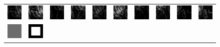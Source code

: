 \documentclass[al, 27pt, plainboxedsections, landscape]{sciposter}
\begin{document}
\begin{multicols}{3}
\begin{figure}[!t]
{\begin{tabular}{cccccccccc}
  \includegraphics[width=0.095\linewidth]{images/micro512_1001}  & \includegraphics[width=0.095\linewidth]{images/micro512_1002} &
  \includegraphics[width=0.095\linewidth]{images/micro512_1003} & \includegraphics[width=0.095\linewidth]{images/micro512_1004} &
  \includegraphics[width=0.095\linewidth]{images/micro512_1005} &
  \includegraphics[width=0.095\linewidth]{images/micro512_1006}  & \includegraphics[width=0.095\linewidth]{images/micro512_1007} &
  \includegraphics[width=0.095\linewidth]{images/micro512_1008} & \includegraphics[width=0.095\linewidth]{images/micro512_1009} &
  \includegraphics[width=0.095\linewidth]{images/micro512_1010} \\
    \includegraphics[width=0.095\linewidth]{images/shapes512_1001}  & \includegraphics[width=0.095\linewidth]{images/shapes512_1002} &

\end{tabular}}
\end{figure}
\end{multicols}
\end{document}
